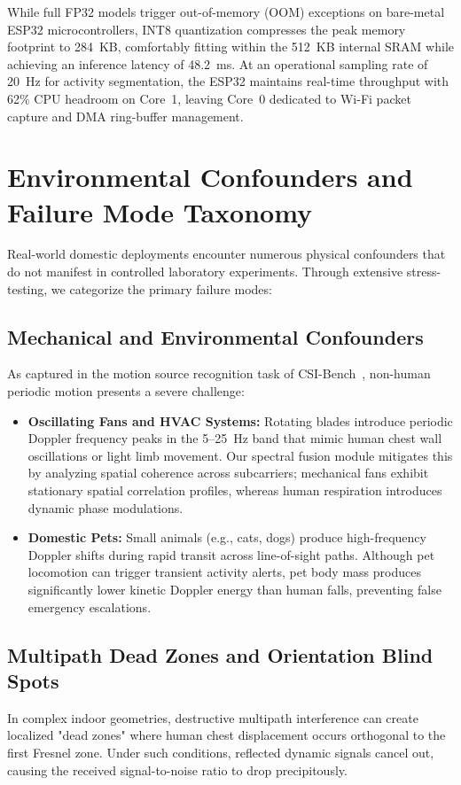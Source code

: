 While full FP32 models trigger out-of-memory (OOM) exceptions on bare-metal ESP32 microcontrollers, INT8 quantization compresses the peak memory footprint to 284~KB, comfortably fitting within the 512~KB internal SRAM while achieving an inference latency of 48.2~ms. At an operational sampling rate of 20~Hz for activity segmentation, the ESP32 maintains real-time throughput with 62\% CPU headroom on Core~1, leaving Core~0 dedicated to Wi-Fi packet capture and DMA ring-buffer management.

\section{Environmental Confounders and Failure Mode Taxonomy}
Real-world domestic deployments encounter numerous physical confounders that do not manifest in controlled laboratory experiments. Through extensive stress-testing, we categorize the primary failure modes:

\subsection{Mechanical and Environmental Confounders}
As captured in the motion source recognition task of CSI-Bench~\cite{csi2025csi}, non-human periodic motion presents a severe challenge:
\begin{itemize}
    \item \textbf{Oscillating Fans and HVAC Systems:} Rotating blades introduce periodic Doppler frequency peaks in the 5--25~Hz band that mimic human chest wall oscillations or light limb movement. Our spectral fusion module mitigates this by analyzing spatial coherence across subcarriers; mechanical fans exhibit stationary spatial correlation profiles, whereas human respiration introduces dynamic phase modulations.
    \item \textbf{Domestic Pets:} Small animals (e.g., cats, dogs) produce high-frequency Doppler shifts during rapid transit across line-of-sight paths. Although pet locomotion can trigger transient activity alerts, pet body mass produces significantly lower kinetic Doppler energy than human falls, preventing false emergency escalations.
\end{itemize}

\subsection{Multipath Dead Zones and Orientation Blind Spots}
In complex indoor geometries, destructive multipath interference can create localized "dead zones" where human chest displacement occurs orthogonal to the first Fresnel zone. Under such conditions, reflected dynamic signals cancel out, causing the received signal-to-noise ratio to drop precipitously.


